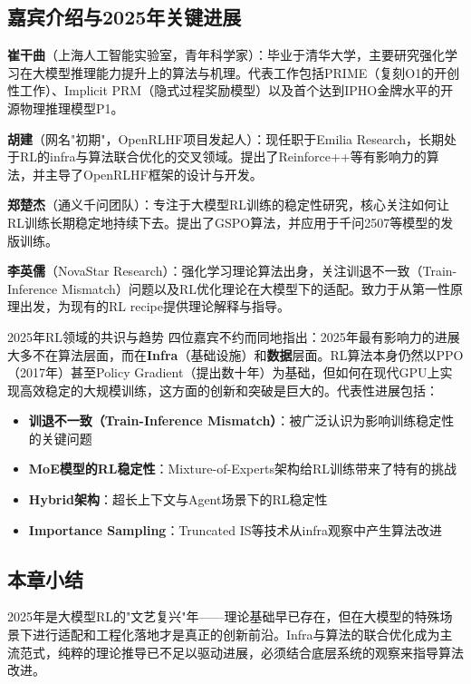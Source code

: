 \documentclass[a4paper]{article}
\begin{document}
\subsection{嘉宾介绍与2025年关键进展}

\textbf{崔干曲}（上海人工智能实验室，青年科学家）：毕业于清华大学，主要研究强化学习在大模型推理能力提升上的算法与机理。代表工作包括PRIME（复刻O1的开创性工作）、Implicit PRM（隐式过程奖励模型）以及首个达到IPHO金牌水平的开源物理推理模型P1。

\textbf{胡建}（网名"初期"，OpenRLHF项目发起人）：现任职于Emilia Research，长期处于RL的infra与算法联合优化的交叉领域。提出了Reinforce++等有影响力的算法，并主导了OpenRLHF框架的设计与开发。

\textbf{郑楚杰}（通义千问团队）：专注于大模型RL训练的稳定性研究，核心关注如何让RL训练长期稳定地持续下去。提出了GSPO算法，并应用于千问2507等模型的发版训练。

\textbf{李英儒}（NovaStar Research）：强化学习理论算法出身，关注训退不一致（Train-Inference Mismatch）问题以及RL优化理论在大模型下的适配。致力于从第一性原理出发，为现有的RL recipe提供理论解释与指导。

\begin{knowledgebox}{2025年RL领域的共识与趋势}
四位嘉宾不约而同地指出：2025年最有影响力的进展大多不在算法层面，而在\textbf{Infra}（基础设施）和\textbf{数据}层面。RL算法本身仍然以PPO（2017年）甚至Policy Gradient（提出数十年）为基础，但如何在现代GPU上实现高效稳定的大规模训练，这方面的创新和突破是巨大的。代表性进展包括：
\begin{itemize}
    \item \textbf{训退不一致（Train-Inference Mismatch）}：被广泛认识为影响训练稳定性的关键问题
    \item \textbf{MoE模型的RL稳定性}：Mixture-of-Experts架构给RL训练带来了特有的挑战
    \item \textbf{Hybrid架构}：超长上下文与Agent场景下的RL稳定性
    \item \textbf{Importance Sampling}：Truncated IS等技术从infra观察中产生算法改进
\end{itemize}
\end{knowledgebox}

\subsection{本章小结}

2025年是大模型RL的"文艺复兴"年——理论基础早已存在，但在大模型的特殊场景下进行适配和工程化落地才是真正的创新前沿。Infra与算法的联合优化成为主流范式，纯粹的理论推导已不足以驱动进展，必须结合底层系统的观察来指导算法改进。
\end{document}
